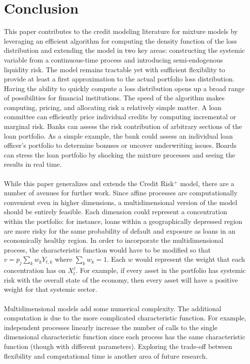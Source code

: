 \documentclass[12pt]{article}
\theoremstyle{definition}
\begin{document}
\section{Conclusion}

This paper contributes to the credit modeling literature for mixture models by leveraging an efficient algorithm for computing the density function of the loss distribution and extending the model in two key areas: constructing the systemic variable from a continuous-time process and introducing semi-endogenous liquidity risk.  The model remains tractable yet with sufficient flexibility to provide at least a first approximation to the actual portfolio loss distribution.  Having the ability to quickly compute a loss distribution opens up a broad range of possibilities for financial institutions.  The speed of the algorithm makes computing, pricing, and allocating risk a relatively simple matter.  A loan committee can efficiently price individual credits by computing incremental or marginal risk.  Banks can assess the risk contribution of arbitrary sections of the loan portfolio.  As a simple example, the bank could assess an individual loan officer's portfolio to determine bonuses or uncover underwriting issues.  Boards can stress the loan portfolio by shocking the mixture processes and seeing the results in real time.  
\\
\\
While this paper generalizes and extends the Credit Risk\(^+\) model, there are a number of avenues for further work.  Since affine processes are computationally convenient even in higher dimensions, a multidimensional version of the model should be entirely feasible.  Each dimension could represent a concentration within the portfolio: for instance, loans within a geographically depressed region are more risky for the same probability of default and exposure as loans in an economically healthy region.  In order to incorporate the multidimensional process, the characteristic function would have to be modified so that \(v=p_j \sum_k w_k Y_{t, k} \) where \(\sum_k w_k=1\).  Each \(w\) would represent the weight that each concentration has on \(X_t ^ j\).  For example, if every asset in the portfolio has systemic risk with the overall state of the economy, then every asset will have a positive weight for that systemic sector.  
\\
\\
Multidimensional models add some numerical complexity.  The additional computation is due to the more complicated characteristic function.  For example, independent processes linearly increase the number of calls to the single dimensional characteristic function since each process has the same characteristic function (though with different parameters).  Exploring the trade-off between flexibility and computational time is another area of future research.
\end{document}
